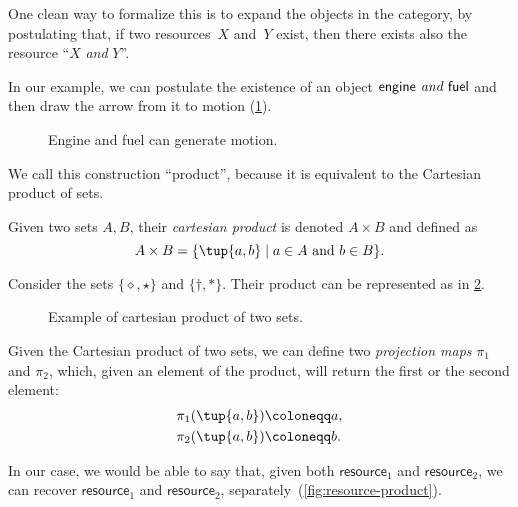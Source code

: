 One clean way to formalize this is to expand the objects in the category, by postulating that, if two resources~$X$ and~$Y$ exist, then there exists also the resource ``$X$ \emph{and} $Y$''.

In our example, we can postulate the existence of an object $\mathsf{engine} \emph{ and }
\mathsf{fuel}$ and then draw the arrow from it to motion (\cref{fig:e13}).

\begin{figure}[h!]
    \centering
    \caption{Engine and fuel can generate motion. \label{fig:e13}}
\end{figure}

We call this construction ``product'', because it is equivalent to
the Cartesian product of sets.

\begin{definition}
\label{def:cartesian-product}
   Given two sets $A,B$, their \emph{cartesian product} is denoted $A\times  B$
   and defined as 
   \begin{equation}
       A\times  B=\{ \tup{a,b}\mid a\in A\text{ and } b\in B\}.
   \end{equation}
\end{definition}

\begin{example}
Consider the sets $\{\diamond,\star\}$ and $\{\dagger, \ast\}$. Their product can be represented as in \cref{fig:cartesian-product}.
\begin{figure}[h!]
    \centering
    \caption{Example of cartesian product of two sets.\label{fig:cartesian-product}}
\end{figure}
\end{example}

\noindent Given the Cartesian product of two sets, we can define two \emph{projection maps} $\pi_1$
and $\pi_2$, which, given an element of the product, will return the first or the second
element:
\begin{equation}
\begin{aligned}
    \pi_1(\tup{a,b}) &\coloneqq a,\\
    \pi_2(\tup{a,b}) &\coloneqq b.
\end{aligned}
\end{equation}

In our case, we would be able to say that, given both $\mathsf{resource}_1$ and $\mathsf{resource}_2$,
we can recover $\mathsf{resource}_1$ and $\mathsf{resource}_2$, separately~(\cref{fig:resource-product}).

